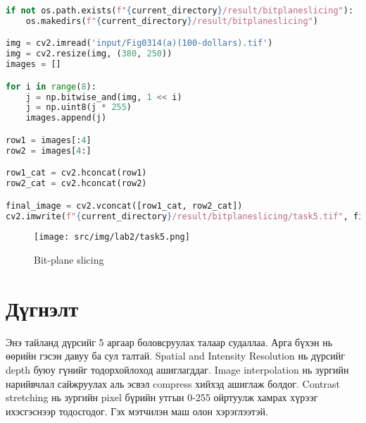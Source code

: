 \begin{lstlisting}[language=Python, caption=Bit-plane slicing, frame=single]
	if not os.path.exists(f"{current_directory}/result/bitplaneslicing"):
	os.makedirs(f"{current_directory}/result/bitplaneslicing")

img = cv2.imread('input/Fig0314(a)(100-dollars).tif')
img = cv2.resize(img, (380, 250))
images = []

for i in range(8):
	j = np.bitwise_and(img, 1 << i)
	j = np.uint8(j * 255)
	images.append(j)

row1 = images[:4]
row2 = images[4:]

row1_cat = cv2.hconcat(row1)
row2_cat = cv2.hconcat(row2)

final_image = cv2.vconcat([row1_cat, row2_cat])
cv2.imwrite(f"{current_directory}/result/bitplaneslicing/task5.tif", final_image)
\end{lstlisting}
\begin{figure}
	\centering
	\texttt{[image: src/img/lab2/task5.png]}
	\caption{Bit-plane slicing}
\end{figure}

\section{Дүгнэлт}
Энэ тайланд дүрсийг 5 аргаар боловсруулах талаар судаллаа. Арга бүхэн нь өөрийн гэсэн давуу ба сул талтай.
Spatial and Intensity Resolution нь дүрсийг depth буюу гүнийг тодорхойлоход ашиглагддаг.
Image interpolation нь зургийн нарийвчлал сайжруулах аль эсвэл compress хийхэд ашиглаж болдог.
Contrast stretching нь зургийн pixel бүрийн утгын 0-255 ойртуулж хамрах хүрээг ихэсгэснээр тодосгодог.
Гэх мэтчилэн маш олон хэрэглээтэй.